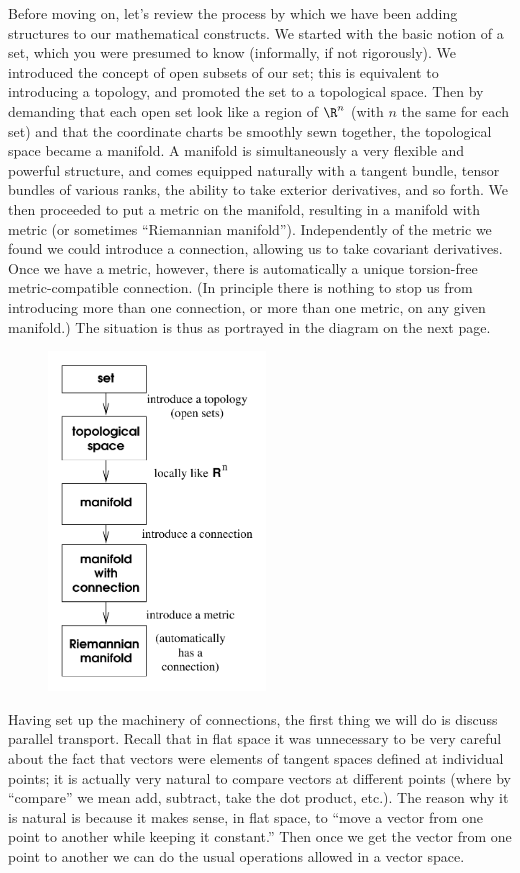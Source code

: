 \documentclass[12pt]{article}
\begin{document}
Before moving on, let's review the process by which we have been
adding structures to our mathematical constructs.  We started with
the basic notion of a set, which you were presumed to know (informally,
if not rigorously).  We introduced the concept of open subsets of
our set; this is equivalent
to introducing a topology, and promoted the set to a topological
space.  Then by demanding that each open set look like a region of
$\R^n$ (with $n$ the same for each set) and that the coordinate
charts be smoothly sewn together, the topological space became a
manifold.  A manifold is simultaneously a very flexible and powerful
structure, and comes equipped naturally with a tangent bundle,
tensor bundles of various ranks, the
ability to take exterior derivatives, and so forth.  We then proceeded
to put a metric on the manifold, resulting in a manifold with metric
(or sometimes ``Riemannian manifold'').
Independently of the metric we found we could introduce a connection,
allowing us to take covariant derivatives.  Once we have a metric,
however,
there is automatically a unique torsion-free metric-compatible
connection.  (In principle there is nothing to stop us from introducing
more than one connection, or more than one metric, on any given
manifold.)  The situation is thus as portrayed in the diagram on
the next page.

\eject

\begin{figure}
  \centerline{
  \includegraphics[height=9cm]{pdf/three1}}
\end{figure}

Having set up the machinery of connections, the first thing we will
do is discuss parallel transport.  Recall that in flat space it was
unnecessary to be very careful about the fact that vectors were
elements of tangent spaces defined at individual points; it is
actually very natural to compare vectors at different points (where
by ``compare'' we mean add, subtract, take the dot product, etc.).
The reason why it is natural is because it makes sense, in flat space,
to ``move a vector from one point to another while keeping it constant.''
Then once we get the vector from one point to another we can do the
usual operations allowed in a vector space.
\end{document}
